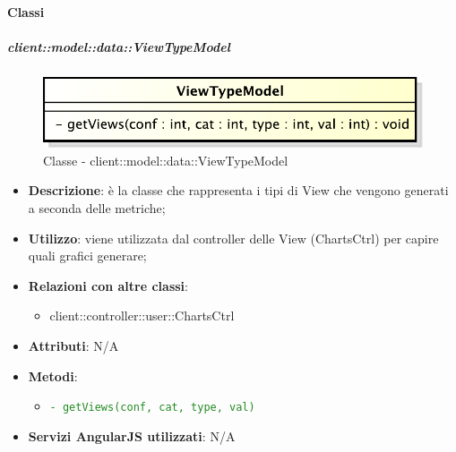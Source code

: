 	\paragraph{Classi} %
		\subparagraph{client::model::data::ViewTypeModel} %
		\label{subp:client_model_data_viewtypemodel}
			\begin{figure}[htbp]
				\centering
				\centerline{\includegraphics[scale=0.7]{./images/client/classes/model/view_type_model.pdf}}
				\caption{Classe - client::model::data::ViewTypeModel}
			\end{figure}
			\begin{itemize}
				\item \textbf{Descrizione}: è la classe che rappresenta i tipi di View che vengono generati a seconda delle metriche;
				\item \textbf{Utilizzo}: viene utilizzata dal controller delle View (ChartsCtrl) per capire quali grafici generare;
				\item \textbf{Relazioni con altre classi}:
					\begin{itemize}
						\item client::controller::user::ChartsCtrl
					\end{itemize}

				\item \textbf{Attributi}: N/A

				\item \textbf{Metodi}:
					\begin{itemize}
						\item \textcolor{forestgreen}{\texttt{- getViews(conf, cat, type, val)}}
					\end{itemize}

				\item \textbf{Servizi AngularJS utilizzati}: N/A

			\end{itemize}

